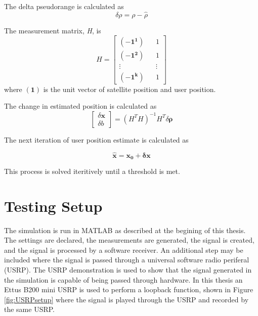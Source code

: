 \documentclass[12pt]{report}
\begin{document}
The delta pseudorange is calculated as 
\begin{equation}
    \delta \rho = \rho - \hat{\rho}
    \label{eqn:deltapseudo}
\end{equation}

The measurement matrix, \textit{H}, is 
\begin{equation}
    H = \begin{bmatrix}
        (-\mathbf{1^1}) && 1 \\
        (-\mathbf{1^2}) && 1 \\
        \vdots && \vdots \\
        (-\mathbf{1^k}) && 1
    \end{bmatrix}
\end{equation}
where $\mathbf{(1)}$ is the unit vector of satellite position and user position. 

The change in estimated position is calculated as 
\begin{equation}
    \begin{bmatrix}
        \delta \mathbf{x} \\
        \delta b
    \end{bmatrix}
    = (H^TH)^{-1}H^T\delta \mathbf{\rho}
\end{equation}

The next iteration of user position estimate is calculated as 

\begin{equation}
\hat{\mathbf{x}} = \mathbf{x_0} + \mathbf{\delta x}
\end{equation}

This process is solved iteritively until a threshold is met.

\section{Testing Setup}
The simulation is run in MATLAB as described at the begining of this thesis. The settings are declared, the measurements are generated, the signal is created, and the signal is processed by a software receiver. An additional step may be included where the signal is passed through a universal software radio periferal (USRP). The USRP demonstration is used to show that the signal generated in the simulation is capable of being passed through hardware. In this thesis an Ettus B200 mini USRP is used to perform a loopback function, shown in Figure \ref{fig:USRPsetup} where the signal is played through the USRP and recorded by the same USRP. 
\end{document}
